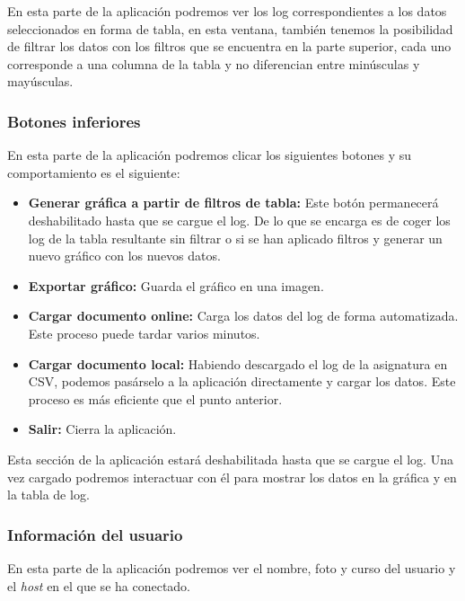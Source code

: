 En esta parte de la aplicación podremos ver los log correspondientes a los datos seleccionados en forma de tabla, en esta ventana, también tenemos la posibilidad de filtrar los datos con los filtros que se encuentra en la parte superior, cada uno corresponde a una columna de la tabla y no diferencian entre minúsculas y mayúsculas.


\subsubsection{Botones inferiores}

En esta parte de la aplicación podremos clicar los siguientes botones y su comportamiento es el siguiente:

\begin{itemize}
	\tightlist
	\item
	\textbf{Generar gráfica a partir de filtros de tabla:} Este botón permanecerá deshabilitado hasta que se cargue el log. De lo que se encarga es de coger los log de la tabla resultante sin filtrar o si se han aplicado filtros y generar un nuevo gráfico con los nuevos datos.
	\item
	\textbf{Exportar gráfico:} Guarda el gráfico en una imagen.
	\item
	\textbf{Cargar documento online:} Carga los datos del log de forma automatizada. Este proceso puede tardar varios minutos.
	\item
	\textbf{Cargar documento local:} Habiendo descargado el log de la asignatura en CSV, podemos pasárselo a la aplicación directamente y cargar los datos. Este proceso es más eficiente que el punto anterior.
	\item
	\textbf{Salir:} Cierra la aplicación.
	
	
\end{itemize}


Esta sección de la aplicación estará deshabilitada hasta que se cargue el log. Una vez cargado podremos interactuar con él para mostrar los datos en la gráfica y en la tabla de log.

\subsubsection{Información del usuario}

En esta parte de la aplicación podremos ver el nombre, foto y curso del usuario y el \emph{host} en el que se ha conectado.

